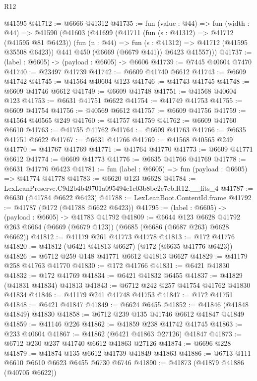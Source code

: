 \begin{lexlean}{R12}
\begin{coremodule}
    @41595
@41712 := @6666 @41312
@41735 := fun (value : @44) =>
  fun (width : @44) =>
  @41590
    (@41603
      (@41699
        (@41711
          (fun (s : @41312) => @41712 (@41595 @81 @6423))
          (fun (n : @44) => fun (s : @41312) => @41712 (@41595 @35508 @6423))
          @441
          @450
          (@6669 (@6679 @441))
          @6423
          @41557)))
@41737 := (label : @6605) -> (payload : @6605) -> @6606
@41739 := @7445 @40604 @7470
@41740 := @23497 @41739
@41742 := @6609 @41740 @6612
@41743 := @6609 @41742
@41745 := @41564 @40604 @123
@41746 := @41743 @41745
@41748 := @6609 @41746 @6612
@41749 := @6609 @41748
@41751 := @41568 @40604 @123
@41753 := @6631 @41751 @6622
@41754 := @41749 @41753
@41755 := @6609 @41754
@41756 := @40569 @6612
@41757 := @6609 @41756
@41759 := @41564 @40565 @249
@41760 := @41757 @41759
@41762 := @6609 @41760 @6610
@41763 := @41755 @41762
@41764 := @6609 @41763
@41766 := @6635 @41751 @6622
@41767 := @6631 @41766
@41769 := @41568 @40565 @249
@41770 := @41767 @41769
@41771 := @41764 @41770
@41773 := @6609 @41771 @6612
@41774 := @6609 @41773
@41776 := @6635 @41766 @41769
@41778 := @6631 @41776 @6423
@41781 := fun (label : @6605) => fun (payload : @6605) => @41774 @41778
@41783 := @6620 @123 @6628
@41784 := LexLeanPreserve.C9d2b4b49701a095494c1c03b8be2e7cb.R12.__fits_4
@41787 := @6630 (@41784 @6622 @6423)
@41788 := LexLeanBoot.ContentId.frame
@41792 := @41787 (@172 (@41788 @6622 @6423))
@41795 := (label : @6605) -> (payload : @6605) -> @41783 @41792
@41809 := @6644
    @123
    @6628
    @41792
    @263
    @6664
    (@6669 (@6679 @123))
    (@6685 (@6686 (@6687 @263) @6628 @6662))
@41812 := @41179 @261 @41773 @41778
@41813 := @172 @41776
@41820 := @41812 (@6421 @41813 @6627) (@172 (@6635 @41776 @6423))
@41826 := @6712 @259 @148 @41771 @6612 @41813 @6627
@41829 := @41179 @258 @41763 @41770
@41830 := @172 @41766
@41831 := @6421 @41830
@41832 := @172 @41769
@41834 := @6421 @41832 @6455
@41837 := @41829 (@41831 @41834) @41813
@41843 := @6712 @242 @257 @41754 @41762 @41830 @41834
@41846 := @41179 @241 @41748 @41753
@41847 := @172 @41751
@41848 := @6421 @41847
@41849 := @6624 @6455
@41852 := @41846 (@41848 @41849) @41830
@41858 := @6712 @239 @135 @41746 @6612 @41847 @41849
@41859 := @41146 @226
@41862 := @41859 @238 @41742 @41745
@41863 := @233 @40604
@41867 := @41862 (@6421 @41863 @27126) @41847
@41873 := @6712 @230 @237 @41740 @6612 @41863 @27126
@41874 := @6696 @228
@41879 := @41874 @135 @6612 @41739 @41849 @41863
@41886 := @6713 @111 @6610 @6610 @6623 @6455 @6730 @6746
@41890 := @41873 (@41879 @41886 (@40705 @6622))

\end{coremodule}
\end{lexlean}
